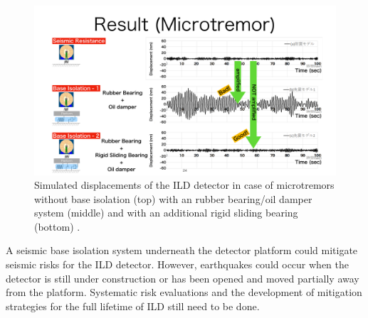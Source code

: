 \begin{figure}[h!]
\centering
\includegraphics[width=0.8\hsize]{Integration/fig/Damping_Microtremor.pdf}
\caption{\label{ild:fig:integration:damping_microtremor}Simulated displacements of the ILD detector in case of microtremors without base isolation (top) with an rubber bearing/oil damper system (middle) and with an additional rigid sliding bearing (bottom) \cite{ild:bib:Seismic_Damping}.}
\end{figure}
A seismic base isolation system underneath the detector platform could mitigate seismic risks for the ILD detector. However, earthquakes could occur when the detector is still under construction or has been opened and moved partially away from the platform. Systematic risk evaluations and the development of mitigation strategies for the full lifetime of ILD still need to be done.
